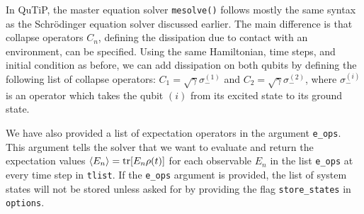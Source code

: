 \documentclass[preprint,3p,sort&compress]{elsarticle}
\def\code#1{\texttt{#1}}
\DeclarePairedDelimiter{\ex}{\langle}{\rangle}
\begin{document}

In QuTiP, the master equation solver \code{mesolve()} follows mostly the same syntax as the Schrödinger equation solver discussed earlier. The main difference is that collapse operators $C_n$, defining the dissipation due to contact with an environment, can be specified. Using the same Hamiltonian, time steps, and initial condition as before, we can add dissipation on both qubits by defining the following list of collapse operators:
$C_1 = \sqrt{\gamma} \sigma_-^{(1)}$ and $C_2 = \sqrt{\gamma} \sigma_-^{(2)}$, where $\sigma_-^{(i)}$ is an operator which takes the qubit $(i)$ from its excited state to its ground state.

%
We have also provided a list of expectation operators in the argument \code{e\_ops}. This argument tells the solver that we want to evaluate and return the expectation values $\ex{E_n} = \tr[E_n \rho(t)]$ for each observable $E_n$ in the list \code{e\_ops} at every time step in \code{tlist}.  If the \code{e\_ops} argument is provided, the list of system states will not be stored unless asked for by providing the flag \code{store\_states} in \code{options}.
\end{document}
